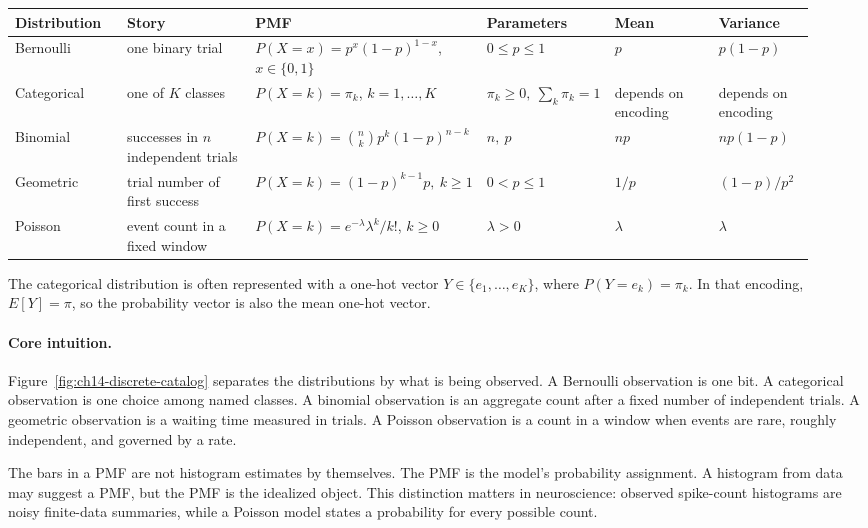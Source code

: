 \begin{center}
\small
\setlength{\tabcolsep}{2pt}
\renewcommand{\arraystretch}{1.22}
\begin{tabular}{p{0.14\linewidth}p{0.16\linewidth}p{0.25\linewidth}p{0.13\linewidth}p{0.13\linewidth}p{0.12\linewidth}}
\toprule
Distribution & Story & PMF & Parameters & Mean & Variance \\
\midrule
Bernoulli & one binary trial & \(P(X=x)=p^x(1-p)^{1-x}\), \(x\in\{0,1\}\) & \(0\leq p\leq1\) & \(p\) & \(p(1-p)\) \\
Categorical & one of \(K\) classes & \(P(X=k)=\pi_k\), \(k=1,\ldots,K\) & \(\pi_k\geq0,\ \sum_k\pi_k=1\) & depends on encoding & depends on encoding \\
Binomial & successes in \(n\) independent trials & \(P(X=k)=\binom nk p^k(1-p)^{n-k}\) & \(n,\ p\) & \(np\) & \(np(1-p)\) \\
Geometric & trial number of first success & \(P(X=k)=(1-p)^{k-1}p,\ k\geq1\) & \(0<p\leq1\) & \(1/p\) & \((1-p)/p^2\) \\
Poisson & event count in a fixed window & \(P(X=k)=e^{-\lambda}\lambda^k/k!\), \(k\geq0\) & \(\lambda>0\) & \(\lambda\) & \(\lambda\) \\
\bottomrule
\end{tabular}
\end{center}

The categorical distribution is often represented with a one-hot vector \(Y\in\{e_1,\ldots,e_K\}\), where \(P(Y=e_k)=\pi_k\). In that encoding, \(E[Y]=\pi\), so the probability vector is also the mean one-hot vector.

\paragraph{Core intuition.}
Figure~\ref{fig:ch14-discrete-catalog} separates the distributions by what is being observed. A Bernoulli observation is one bit. A categorical observation is one choice among named classes. A binomial observation is an aggregate count after a fixed number of independent trials. A geometric observation is a waiting time measured in trials. A Poisson observation is a count in a window when events are rare, roughly independent, and governed by a rate.

The bars in a PMF are not histogram estimates by themselves. The PMF is the model's probability assignment. A histogram from data may suggest a PMF, but the PMF is the idealized object. This distinction matters in neuroscience: observed spike-count histograms are noisy finite-data summaries, while a Poisson model states a probability for every possible count.

